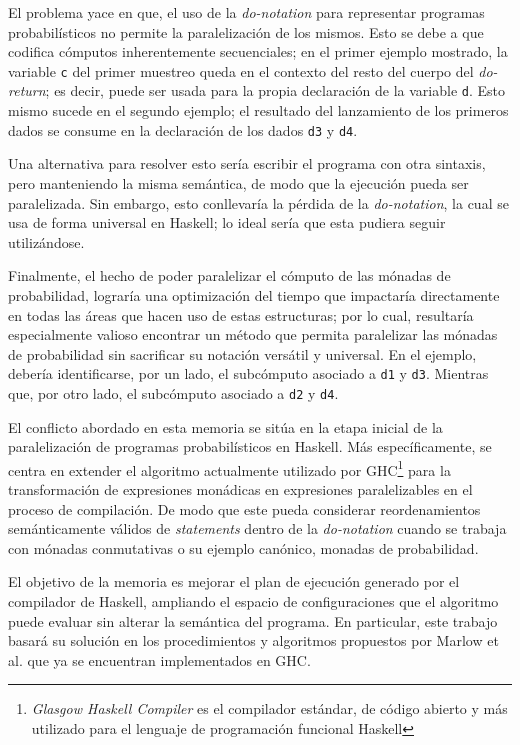 El problema yace en que, el uso de la \textit{do-notation} para representar programas probabilísticos no permite la paralelización de los mismos. Esto se debe a que codifica cómputos inherentemente secuenciales; en el primer ejemplo mostrado, la variable \texttt{c} del primer muestreo queda en el contexto del resto del cuerpo del \textit{do-return}; es decir, puede ser usada para la propia declaración de la variable \texttt{d}. Esto mismo sucede en el segundo ejemplo; el resultado del lanzamiento de los primeros dados se consume en la declaración de los dados \verb|d3| y \verb|d4|. 

Una alternativa para resolver esto sería escribir el programa con otra sintaxis, pero manteniendo la misma semántica, de modo que la ejecución pueda ser paralelizada. Sin embargo, esto conllevaría la pérdida de la \textit{do-notation}, la cual se usa de forma universal en \textsf{Haskell}; lo ideal sería que esta pudiera seguir utilizándose.

Finalmente, el hecho de poder paralelizar el cómputo de las mónadas de probabilidad, lograría una optimización del tiempo que impactaría directamente en todas las áreas que hacen uso de estas estructuras; por lo cual, resultaría especialmente valioso encontrar un método que permita paralelizar las mónadas de probabilidad sin sacrificar su notación versátil y universal. En el ejemplo, debería identificarse, por un lado, el subcómputo asociado a \verb|d1| y \verb|d3|. Mientras que, por otro lado, el subcómputo asociado a \verb|d2| y \verb|d4|.

\newpage

El conflicto abordado en esta memoria se sitúa en la etapa inicial de la paralelización de programas probabilísticos en \textsf{Haskell}. Más específicamente, se centra en extender el algoritmo actualmente utilizado por \textsf{GHC}\footnote{\textit{Glasgow Haskell Compiler} es el compilador estándar, de código abierto y más utilizado para el lenguaje de programación funcional \textsf{Haskell}} para la transformación de expresiones monádicas en expresiones paralelizables en el proceso de compilación. De modo que este pueda considerar reordenamientos semánticamente válidos de \textit{statements} dentro de la \textit{do-notation} cuando se trabaja con mónadas conmutativas o su ejemplo canónico, monadas de probabilidad. 

El objetivo de la memoria es mejorar el plan de ejecución generado por el compilador de \textsf{Haskell}, ampliando el espacio de configuraciones que el algoritmo puede evaluar sin alterar la semántica del programa. En particular, este trabajo basará su solución en los procedimientos y algoritmos propuestos por Marlow et al. \cite{MarlowPJKM2016} que ya se encuentran implementados en \textsf{GHC}.